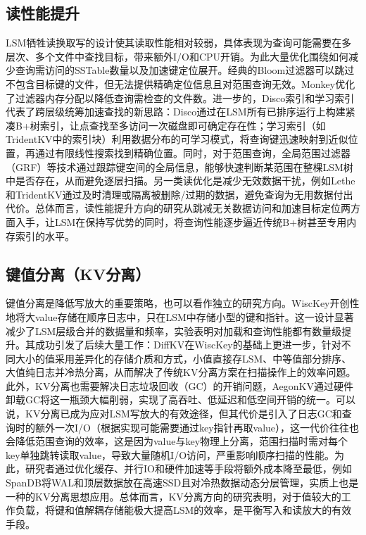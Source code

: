 \documentclass[lang=cn,11pt,a4paper]{elegantpaper}
\begin{document}
	\subsection{读性能提升}
	LSM牺牲读换取写的设计使其读取性能相对较弱，具体表现为查询可能需要在多层次、多个文件中查找目标，带来额外I/O和CPU开销。为此大量优化围绕如何减少查询需访问的SSTable数量以及加速键定位展开。经典的Bloom过滤器可以跳过不包含目标键的文件，但无法提供精确定位信息且对范围查询无效。Monkey优化了过滤器内存分配以降低查询需检查的文件数\cite{DBLP:conf/sigmod/DayanAI17}。进一步的，Disco索引和学习索引代表了跨层级统筹加速查找的新思路：Disco通过在LSM所有已排序运行上构建紧凑B+树索引，让点查找至多访问一次磁盘即可确定存在性\cite{DBLP:journals/pacmmod/ZhongCWE25}；学习索引（如TridentKV中的索引块）利用数据分布的可学习模式，将查询键迅速映射到近似位置，再通过有限线性搜索找到精确位置\cite{DBLP:journals/tpds/LuZWFZD22}。同时，对于范围查询，全局范围过滤器（GRF）等技术通过跟踪键空间的全局信息，能够快速判断某范围在整棵LSM树中是否存在，从而避免逐层扫描\cite{DBLP:journals/pacmmod/WangGYZ24}。另一类读优化是减少无效数据干扰，例如Lethe和TridentKV通过及时清理或隔离被删除/过期的数据，避免查询为无用数据付出代价\cite{DBLP:conf/sigmod/SarkarPSA20, DBLP:journals/tpds/LuZWFZD22}。总体而言，读性能提升方向的研究从跳减无关数据访问和加速目标定位两方面入手，让LSM在保持写优势的同时，将查询性能逐步逼近传统B+树甚至专用内存索引的水平。
	
	\subsection{键值分离（KV分离）}
	键值分离是降低写放大的重要策略，也可以看作独立的研究方向。WiscKey开创性地将大value存储在顺序日志中，只在LSM中存储小型的键和指针。这一设计显著减少了LSM层级合并的数据量和频率，实验表明对加载和查询性能都有数量级提升\cite{DBLP:conf/fast/LuPAA16}。其成功引发了后续大量工作：DiffKV在WiscKey的基础上更进一步，针对不同大小的值采用差异化的存储介质和方式，小值直接存LSM、中等值部分排序、大值纯日志并冷热分离，从而解决了传统KV分离方案在扫描操作上的效率问题\cite{DBLP:conf/usenix/LiLLWXWTLC21}。此外，KV分离也需要解决日志垃圾回收（GC）的开销问题，AegonKV通过硬件卸载GC将这一瓶颈大幅削弱，实现了高吞吐、低延迟和低空间开销的统一\cite{DBLP:conf/fast/DuanFLL0L25}。可以说，KV分离已成为应对LSM写放大的有效途径，但其代价是引入了日志GC和查询时的额外一次I/O（根据实现可能需要通过key指针再取value），这一代价往往也会降低范围查询的效率，这是因为value与key物理上分离，范围扫描时需对每个key单独跳转读取value，导致大量随机I/O访问，严重影响顺序扫描的性能。为此，研究者通过优化缓存、并行IO和硬件加速等手段将额外成本降至最低，例如SpanDB将WAL和顶层数据放在高速SSD且对冷热数据动态分层管理，实质上也是一种的KV分离思想应用\cite{DBLP:conf/fast/ChenRLMX21}。总体而言，KV分离方向的研究表明，对于值较大的工作负载，将键和值解耦存储能极大提高LSM的效率，是平衡写入和读放大的有效手段。
	
\end{document}
